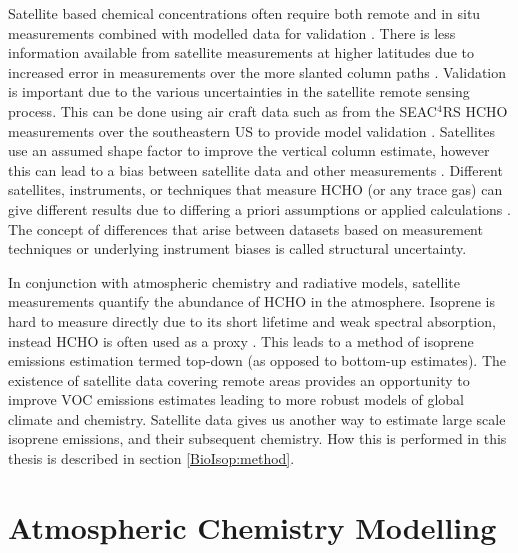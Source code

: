       Satellite based chemical concentrations often require both remote and in situ measurements combined with modelled data for validation \parencite{Marais2014}.
      There is less information available from satellite measurements at higher latitudes due to increased error in measurements over the more slanted column paths \parencite{DeSmedt2015}.
      Validation is important due to the various uncertainties in the satellite remote sensing process.
      This can be done using air craft data such as from the SEAC$^4$RS HCHO measurements over the southeastern US to provide model validation \parencite[e.g.][]{Zhu2016}. 
      Satellites use an assumed shape factor to improve the vertical column estimate, however this can lead to a bias between satellite data and other measurements \parencite{Zhu2016}.
      Different satellites, instruments, or techniques that measure HCHO (or any trace gas) can give different results due to differing a priori assumptions or applied calculations \parencite{Lorente2017}.
      The concept of differences that arise between datasets based on measurement techniques or underlying instrument biases is called structural uncertainty.
      
      In conjunction with atmospheric chemistry and radiative models, satellite measurements quantify the abundance of HCHO in the atmosphere.
      Isoprene is hard to measure directly due to its short lifetime and weak spectral absorption, instead HCHO is often used as a proxy \parencite{Millet2006, Fu2007, Dufour2009, Marais2012, bauwens2013satellite, Kefauver2014, Bauwens2016, Surl2018}.
      This leads to a method of isoprene emissions estimation termed top-down (as opposed to bottom-up estimates).
      The existence of satellite data covering remote areas provides an opportunity to improve VOC emissions estimates leading to more robust models of global climate and chemistry. 
      Satellite data gives us another way to estimate large scale isoprene emissions, and their subsequent chemistry.
      How this is performed in this thesis is described in section \ref{BioIsop:method}.
  
\section{Atmospheric Chemistry Modelling}
\label{LR:Models}
  

